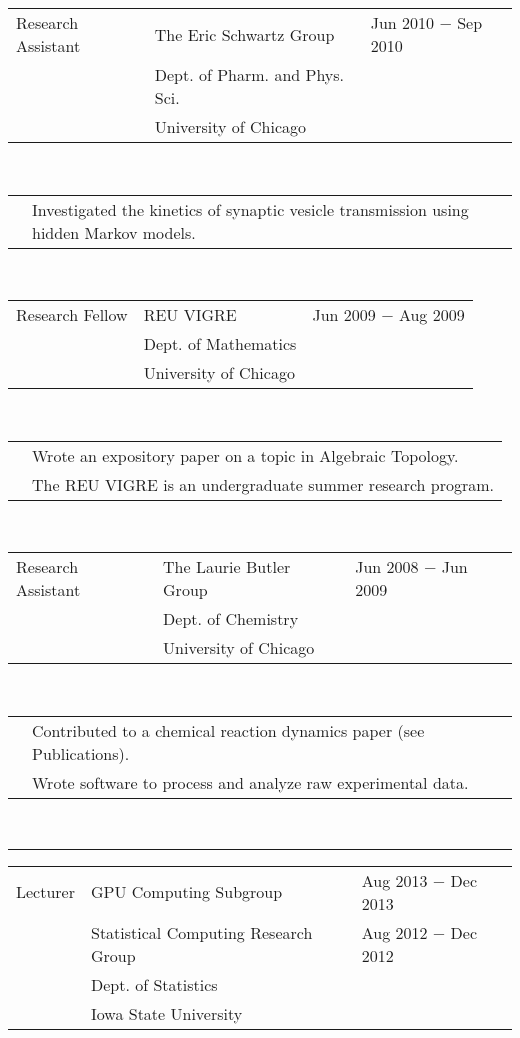 \documentclass{article}
\newcommand{\q}{$\quad$ \newline}
\newcommand{\vl}{4.25}
\newcommand{\wl}{8.4}
\newcommand{\ww}{13}
\newcommand{\myrule}{\noindent \rule{\textwidth}{1pt}}
\begin{document}
\noindent \begin{tabular}{@{}p{\vl cm}p{\wl cm}l@{}}
Research Assistant & The Eric Schwartz Group & Jun 2010 $-$ Sep 2010  \\ 
 &Dept. of Pharm. and Phys. Sci.&  \\ 
 &University of Chicago &
\end{tabular} \q \q

\noindent \begin{tabular}{@{}p{\vl cm}p{\ww cm}@{}}
&Investigated the kinetics of synaptic vesicle transmission using hidden Markov models.
\end{tabular} \q \q

\noindent \begin{tabular}{@{}p{\vl cm}p{\wl cm}l@{}}
Research Fellow & REU VIGRE & Jun 2009 $-$ Aug 2009  \\ 
 &Dept. of Mathematics &  \\ 
 &University of Chicago & 
\end{tabular} \q \q

\noindent \begin{tabular}{@{}p{\vl cm}p{\ww cm}@{}}
& Wrote an expository paper on a topic in Algebraic Topology. \\
& The REU VIGRE is an undergraduate summer research program. 
\end{tabular} \q \q

\noindent \begin{tabular}{@{}p{\vl cm}p{\wl cm}l@{}}
Research Assistant & The Laurie Butler Group & Jun 2008 $-$ Jun 2009  \\ 
 &Dept. of Chemistry &  \\ 
 &University of Chicago &
\end{tabular} \q \q

\noindent \begin{tabular}{@{}p{\vl cm}p{\ww cm}@{}}
& Contributed to a chemical reaction dynamics paper (see Publications). \\
& Wrote software to process and analyze raw experimental data.
\end{tabular} \q \q \q


\myrule
 
\noindent \begin{tabular}{@{}p{\vl cm}p{\wl cm}l@{}}
Lecturer & GPU Computing Subgroup & Aug 2013 $-$ Dec 2013 \\
& Statistical Computing Research Group & Aug 2012 $-$ Dec 2012 \\
& Dept. of Statistics & \\
& Iowa State University & 
\end{tabular} \q \q
   
\end{document}
